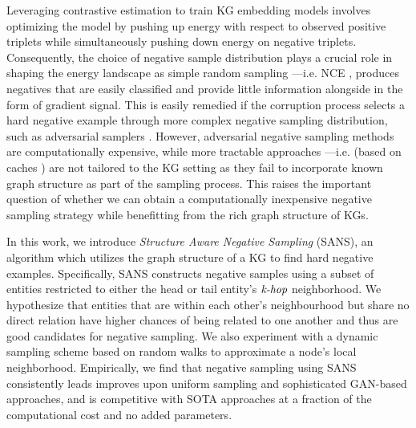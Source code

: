 Leveraging contrastive estimation to train KG embedding models involves optimizing the model by pushing up energy with respect to observed positive triplets while simultaneously pushing down energy on negative triplets. Consequently, the choice of negative sample distribution plays a crucial role in shaping the energy landscape as simple random sampling ---i.e. NCE \cite{gutmann2010noise}, produces negatives that are easily classified and provide little information alongside in the form of gradient signal. This is easily remedied if the corruption process selects a hard negative example through more complex negative sampling distribution, such as adversarial samplers \cite{cai2017kbgan, bose2018adversarial, sun2019rotate}. However, adversarial negative sampling methods are computationally expensive, while more tractable approaches ---i.e. (based on caches \cite{zhang2019nscaching}) are not tailored to the KG setting as they fail to incorporate known graph structure as part of the sampling process. This raises the important question of whether we can obtain a computationally inexpensive negative sampling strategy while benefitting from the rich graph structure of KGs.

In this work, we introduce \emph{Structure Aware Negative Sampling} (SANS), an algorithm which utilizes the graph structure of a KG to find hard negative examples. Specifically, SANS constructs negative samples using a subset of entities restricted to either the head or tail entity's $\emph{k-hop}$ neighborhood. We hypothesize that entities that are within each other's neighbourhood but share no direct relation have higher chances of being related to one another and thus are good candidates for negative sampling. We also experiment with a dynamic sampling scheme based on random walks to approximate a node's local neighborhood. Empirically, we find that negative sampling using SANS consistently leads improves upon uniform sampling and sophisticated GAN-based approaches, and is competitive with SOTA approaches at a fraction of the computational cost and no added parameters.

